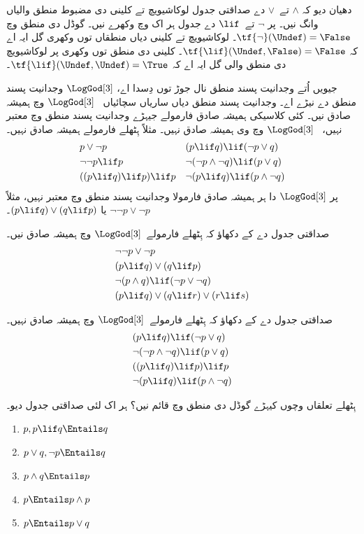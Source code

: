 \documentclass[../../../include/open-logic-section]{subfiles}
\begin{document}
دھیان دیو کہ $\land$ تے~$\lor$ دے صداقتی جدول لوکاشیویچ
تے کلینی دی مضبوط منطق والیاں وانگ نیں۔ پر $\lnot$ تے~$\lif$
دے جدول ہر اک وچ وکھرے نیں۔ گوڈل دی منطق وچ
$\tf{\lnot}(\Undef) = \False$۔ لوکاشیویچ تے کلینی دیاں منطقاں
توں وکھری گل ایہ اے کہ $\tf{\lif}(\Undef, \False) = \False$۔
کلینی دی منطق توں وکھری پر لوکاشیویچ دی منطق والی گل ایہ اے
کہ $\tf{\lif}(\Undef,
\Undef) = \True$۔

جیویں اُتے وجدانیت پسند منطق نال جوڑ توں دِسدا اے، $\LogGod[3]$
وجدانیت پسند منطق دے نیڑے اے۔ وجدانیت پسند منطق دیاں ساریاں سچائیاں
~$\LogGod[3]$ وچ ہمیشہ صادق نیں۔ کئی کلاسیکی ہمیشہ صادق فارمولے
جیہڑے وجدانیت پسند منطق وچ معتبر نہیں، ~$\LogGod[3]$ وچ وی
ہمیشہ صادق نہیں۔ مثلاً ہِٹھلے فارمولے ہمیشہ صادق نہیں۔
\begin{align*}
  & p \lor \lnot p && (p \lif q) \lif (\lnot p \lor q) \\
  & \lnot\lnot p \lif p && \lnot(\lnot p \land \lnot q) \lif (p \lor q) \\
  & ((p \lif q) \lif p) \lif p && \lnot(p \lif q) \lif (p \land \lnot q)
\end{align*}
پر $\LogGod[3]$ دا ہر ہمیشہ صادق فارمولا وجدانیت پسند منطق وچ
معتبر نہیں، مثلاً $\lnot\lnot p \lor \lnot p$ یا $(p
\lif q) \lor (q \lif p)$۔

\begin{prob}
  صداقتی جدول دے کے دکھاؤ کہ ہِٹھلے فارمولے~$\LogGod[3]$
  وچ ہمیشہ صادق نیں۔
  \begin{align*}
    & \lnot\lnot p \lor \lnot p\\
    & (p \lif q) \lor (q \lif p) \\
    & \lnot(p \land q) \lif (\lnot p \lor \lnot q) \\
    & (p \lif q) \lor (q \lif r) \lor (r \lif s)
  \end{align*}
\end{prob}

\begin{prob}
  صداقتی جدول دے کے دکھاؤ کہ ہِٹھلے فارمولے~$\LogGod[3]$
  وچ ہمیشہ صادق نہیں۔
  \begin{align*}
    & (p \lif q) \lif (\lnot p \lor q) \\
    & \lnot(\lnot p \land \lnot q) \lif (p \lor q) \\
    & ((p \lif q) \lif p) \lif p \\
    & \lnot(p \lif q) \lif (p \land \lnot q)
  \end{align*}
\end{prob}

\begin{prob}
  ہِٹھلے تعلقاں وچوں کیہڑے گوڈل دی منطق وچ قائم نیں؟
  ہر اک لئی صداقتی جدول دیو۔
  \begin{enumerate}
    \item $p, p \lif q \Entails q$
    \item $p \lor q, \lnot p \Entails q$
    \item $p \land q \Entails p$
    \item $p \Entails p \land p$
    \item $p \Entails p \lor q$
  \end{enumerate}
\end{prob}
\end{document}
